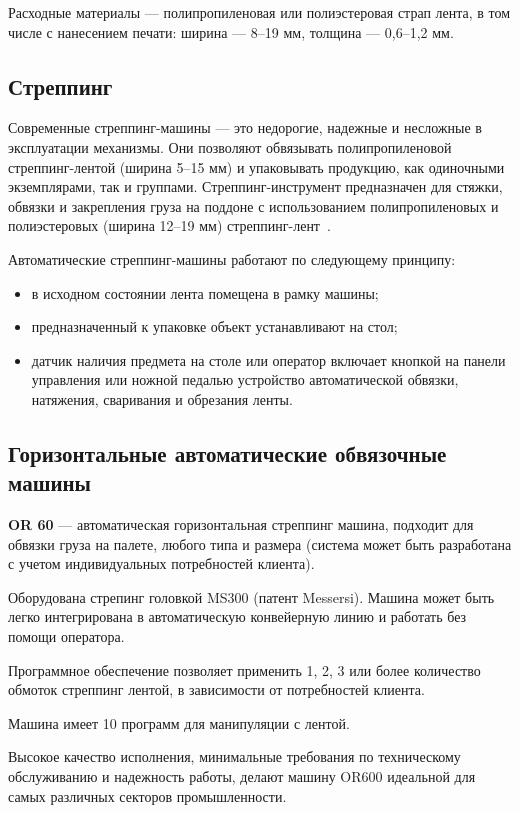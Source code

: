 Расходные материалы --- полипропиленовая или полиэстеровая страп лента, в том числе с нанесением печати: ширина --- 8--19 мм, толщина --- 0,6--1,2 мм.

\subsection*{Стреппинг}

Современные стреппинг-машины --- это недорогие, надежные и несложные в эксплуатации механизмы. Они позволяют обвязывать полипропиленовой стреппинг-лентой (ширина 5--15 мм) и упаковывать продукцию, как одиночными экземплярами, так и группами. Стреппинг-инструмент предназначен для стяжки, обвязки и закрепления груза на поддоне с использованием полипропиленовых и полиэстеровых (ширина 12--19 мм) стреппинг-лент~\cite{bar:strepping}.

Автоматические стреппинг-машины работают по следующему принципу:

\begin{itemize}
    \item в исходном состоянии лента помещена в рамку машины;
    \item предназначенный к упаковке объект устанавливают на стол;
    \item датчик наличия предмета на столе или оператор включает кнопкой на панели управления или ножной педалью устройство автоматической обвязки, натяжения, сваривания и обрезания ленты.
\end{itemize}

\subsection*{Горизонтальные автоматические обвязочные машины}

\textbf{OR 60} --- автоматическая горизонтальная стреппинг машина, подходит для обвязки груза на палете, любого типа и размера (система может быть разработана с учетом индивидуальных потребностей клиента).

Оборудована стрепинг головкой MS300 (патент Messersi). Машина может быть легко интегрирована в автоматическую конвейерную линию и работать без помощи оператора.

Программное обеспечение позволяет применить 1, 2, 3 или более количество обмоток стреппинг лентой, в зависимости от потребностей клиента.

Машина имеет 10 программ для манипуляции с лентой.

Высокое качество исполнения, минимальные требования по техническому обслуживанию и надежность работы, делают машину OR600 идеальной для самых различных секторов промышленности.

